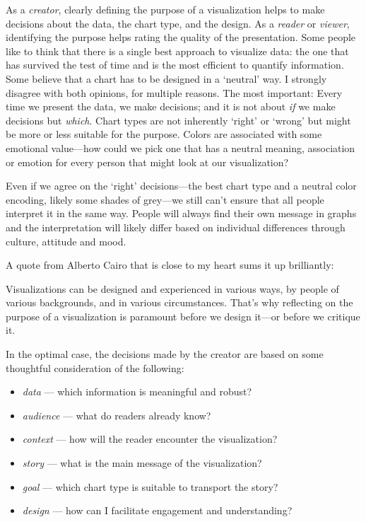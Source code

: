 \documentclass[
]{krantz}
\providecommand{\tightlist}{%
  \setlength{\itemsep}{0pt}\setlength{\parskip}{0pt}}
\renewenvironment{quote}{\begin{VF}}{\end{VF}}
\begin{document}
As a \emph{creator}, clearly defining the purpose of a visualization helps to make decisions about the data, the chart type, and the design. As a \emph{reader} or \emph{viewer}, identifying the purpose helps rating the quality of the presentation. Some people like to think that there is a single best approach to visualize data: the one that has survived the test of time and is the most efficient to quantify information. Some believe that a chart has to be designed in a `neutral' way. I strongly disagree with both opinions, for multiple reasons. The most important: Every time we present the data, we make decisions; and it is not about \emph{if} we make decisions but \emph{which}. Chart types are not inherently `right' or `wrong' but might be more or less suitable for the purpose. Colors are associated with some emotional value---how could we pick one that has a neutral meaning, association or emotion for every person that might look at our visualization?

Even if we agree on the `right' decisions---the best chart type and a neutral color encoding, likely some shades of grey---we still can't ensure that all people interpret it in the same way. People will always find their own message in graphs and the interpretation will likely differ based on individual differences through culture, attitude and mood.

A quote from Alberto Cairo that is close to my heart sums it up brilliantly:

\begin{quote}
Visualizations can be designed and experienced in various ways, by people of various backgrounds, and in various circumstances. That's why reflecting on the purpose of a visualization is paramount before we design it---or before we critique it. \citep{cairo2021}
\end{quote}

In the optimal case, the decisions made by the creator are based on some thoughtful consideration of the following:

\begin{itemize}
\tightlist
\item
  \emph{data} --- which information is meaningful and robust?
\item
  \emph{audience} --- what do readers already know?
\item
  \emph{context} --- how will the reader encounter the visualization?
\item
  \emph{story} --- what is the main message of the visualization?
\item
  \emph{goal} --- which chart type is suitable to transport the story?
\item
  \emph{design} --- how can I facilitate engagement and understanding?
\end{itemize}
\end{document}

